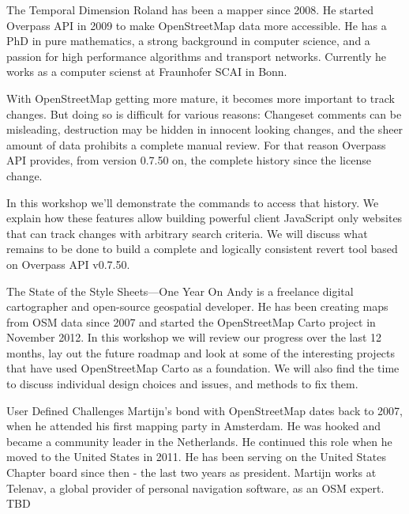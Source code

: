 %
{The Temporal Dimension}%
{Roland has been a mapper since 2008. He started Overpass API in 2009 to make OpenStreetMap data more accessible. He has a PhD in pure mathematics, a strong background in computer science, and a passion for high performance algorithms and transport networks. Currently he works as a computer scienst at Fraunhofer SCAI in Bonn. }%
{With OpenStreetMap getting more mature, it becomes more important to track changes. But doing so is difficult for various reasons: Changeset comments can be misleading, destruction may be hidden in innocent looking changes, and the sheer amount of data prohibits a complete manual review. For that reason Overpass API provides, from version 0.7.50 on, the complete history since the license change. 

In this workshop we'll demonstrate the commands to access that history. We explain how these features allow building powerful client JavaScript only websites that can track changes with arbitrary search criteria. We will discuss what remains to be done to build a complete and logically consistent revert tool based on Overpass API v0.7.50. }


%
{The State of the Style Sheets---One Year On}%
{Andy is a freelance digital cartographer and open-source geospatial developer. He has been creating maps from OSM data since 2007 and started the OpenStreetMap Carto project in November 2012. }%
{ In this workshop we will review our progress over the last 12 months, lay out the future roadmap and look at some of the interesting projects that have used OpenStreetMap Carto as a foundation. We will also find the time to discuss individual design choices and issues, and methods to fix them.
}

%
{User Defined Challenges}%
{Martijn's bond with OpenStreetMap dates back to 2007, when he attended his first mapping party in Amsterdam. He was hooked and became a community leader in the Netherlands. He continued this role when he moved to the United States in 2011. He has been serving on the United States Chapter board since then - the last two years as president. Martijn works at Telenav, a global provider of personal navigation software, as an OSM expert. }%
{TBD
}%
